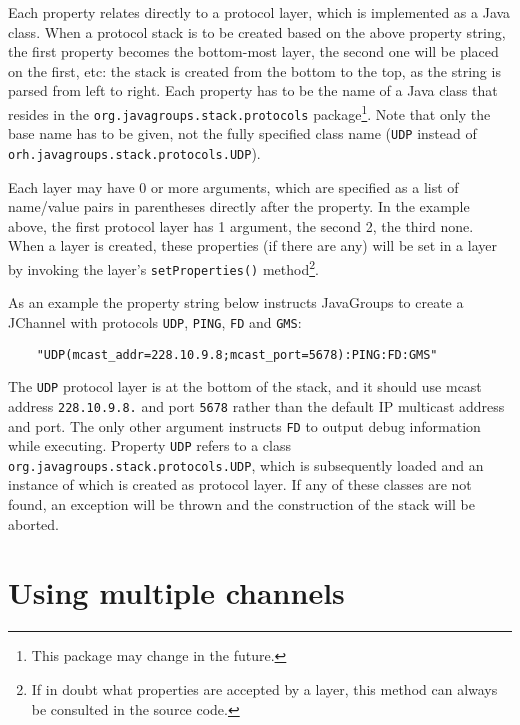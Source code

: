    Each property relates directly to a protocol layer, which is implemented as a
    Java class. When a protocol stack is to be created based on the above property
    string, the first property becomes the bottom-most layer, the second one will be
    placed on the first, etc: the stack is created from the bottom to the top, as the
    string is parsed from left to right. Each property has to be the name of a Java
    class that resides in the {\tt org.javagroups.stack.protocols}
    package\footnote{This package may change in the future.}. Note that only the base
    name has to be given, not the fully specified class name ({\tt UDP} instead of
    {\tt orh.javagroups.stack.protocols.UDP}).

    Each layer may have 0 or more arguments, which are specified as a list of
    name/value pairs in parentheses directly after the property. In the example
    above, the first protocol layer has 1 argument, the second 2, the third
    none. When a layer is created, these properties (if there are any) will be set in
    a layer by invoking the layer's {\tt setProperties()} method\footnote{If in doubt
    what properties are accepted by a layer, this method can always be consulted in
    the source code.}.

    As an example the property string below instructs JavaGroups to create a JChannel
    with protocols {\tt UDP}, {\tt PING}, {\tt FD} and {\tt GMS}:


    \begin{small}
    \begin{verbatim}
    "UDP(mcast_addr=228.10.9.8;mcast_port=5678):PING:FD:GMS"
    \end{verbatim}
    \end{small}


    The {\tt UDP} protocol layer is at the bottom of the stack, and it should use
    mcast address {\tt 228.10.9.8.} and port {\tt 5678} rather than the default IP
    multicast address and port. The only other argument instructs {\tt FD} to output
    debug information while executing. Property {\tt UDP} refers to a class {\tt
    org.javagroups.stack.protocols.UDP}, which is subsequently loaded and an instance
    of which is created as protocol layer. If any of these classes are not found, an
    exception will be thrown and the construction of the stack will be aborted.






  \section{Using multiple channels} \label{MultipleChannels}

